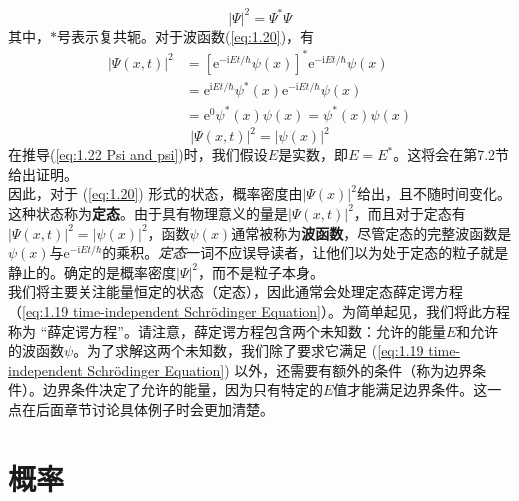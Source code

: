 	\begin{equation}
		\boxed{\left|\Psi\right|^2=\Psi^{\ast}\Psi}
		\label{eq:1.21 square of Psi}
	\end{equation}
	其中，$\ast$号表示复共轭。对于波函数(\ref{eq:1.20})，有
	\begin{equation*}
		\begin{aligned}
			\left|\Psi\left(x,t\right)\right|^2 &=\left[\mathrm{e}^{-\mathrm{i}Et/\hbar}\psi\left(x\right)\right]^{\ast}\mathrm{e}^{-\mathrm{i}Et/\hbar}\psi\left(x\right)\\
			& = \mathrm{e}^{\mathrm{i}Et/\hbar}\psi^{\ast}\left(x\right)\mathrm{e}^{-\mathrm{i}Et/\hbar}\psi\left(x\right)\\
			& = \mathrm{e}^0\psi^{\ast}\left(x\right)\psi\left(x\right)=\psi^\ast\left(x\right)\psi\left(x\right)
		\end{aligned}
	\end{equation*}
	\begin{equation}
		\left|\Psi\left(x,t\right)\right|^2=\left|\psi\left(x\right)\right|^2
		\label{eq:1.22 Psi and psi}
	\end{equation}
	在推导(\ref{eq:1.22 Psi and psi})时，我们假设$E$是实数，即$E=E^{\ast}$。这将会在第7.2节给出证明。\\
	\indent 因此，对于 (\ref{eq:1.20}) 形式的状态，概率密度由$\left|\Psi\left(x\right)\right|^2$给出，且不随时间变化。这种状态称为\textbf{定态}。由于具有物理意义的量是$\left|\Psi\left(x,t\right)\right|^2$，而且对于定态有$\left|\Psi\left(x,t\right)\right|^2=\left|\psi\left(x\right)\right|^2$，函数$\psi\left(x\right)$通常被称为\textbf{波函数}，尽管定态的完整波函数是$\psi\left(x\right)$与$\mathrm{e}^{-\mathrm{i}Et/\hbar}$的乘积。\textit{定态}一词不应误导读者，让他们以为处于定态的粒子就是静止的。确定的是概率密度$\left|\Psi\right|^2$，而不是粒子本身。\\
	\indent 我们将主要关注能量恒定的状态（定态），因此通常会处理定态薛定谔方程（\ref{eq:1.19 time-independent Schrödinger Equation}）。为简单起见，我们将此方程称为 “薛定谔方程”。请注意，薛定谔方程包含两个未知数：允许的能量$E$和允许的波函数$ \psi$。为了求解这两个未知数，我们除了要求它满足 (\ref{eq:1.19 time-independent Schrödinger Equation}) 以外，还需要有额外的条件（称为边界条件）。边界条件决定了允许的能量，因为只有特定的$E$值才能满足边界条件。这一点在后面章节讨论具体例子时会更加清楚。
	
	
	
	
	
	
	\section{概率}
	
